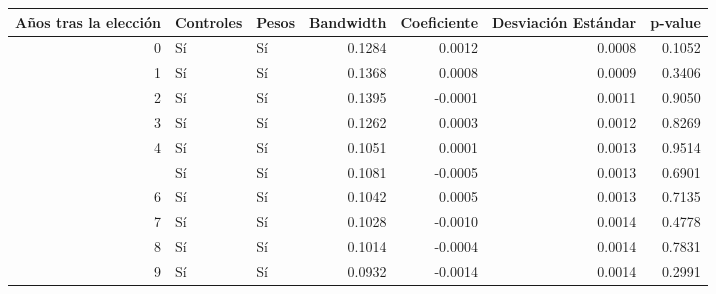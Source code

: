 
\begin{tabular}{rllrrrr}
\toprule
Años tras la elección & Controles & Pesos & Bandwidth & Coeficiente & Desviación Estándar & p-value\\
\midrule
0 & Sí & Sí & 0.1284 & 0.0012 & 0.0008 & 0.1052\\
1 & Sí & Sí & 0.1368 & 0.0008 & 0.0009 & 0.3406\\
2 & Sí & Sí & 0.1395 & -0.0001 & 0.0011 & 0.9050\\
3 & Sí & Sí & 0.1262 & 0.0003 & 0.0012 & 0.8269\\
4 & Sí & Sí & 0.1051 & 0.0001 & 0.0013 & 0.9514\\
\addlinespace
5 & Sí & Sí & 0.1081 & -0.0005 & 0.0013 & 0.6901\\
6 & Sí & Sí & 0.1042 & 0.0005 & 0.0013 & 0.7135\\
7 & Sí & Sí & 0.1028 & -0.0010 & 0.0014 & 0.4778\\
8 & Sí & Sí & 0.1014 & -0.0004 & 0.0014 & 0.7831\\
9 & Sí & Sí & 0.0932 & -0.0014 & 0.0014 & 0.2991\\
\bottomrule
\end{tabular}